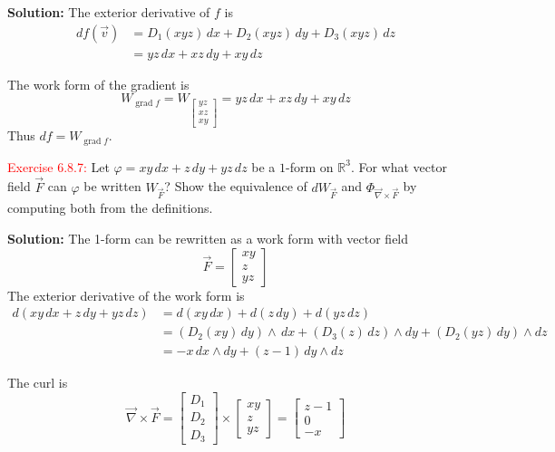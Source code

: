 \documentclass[12pt]{article}
\newcommand{\RR}{\mathbb{R}}
\begin{document}
\textbf{Solution:} 
The exterior derivative of $f$ is 
\begin{align*}
    df(\vec v) 
    &= D_1(xyz) \,dx + D_2(xyz) \,dy + D_3(xyz) \,dz \\
    &= yz \,dx + xz \,dy + xy \,dz
\end{align*}
    
The work form of the gradient is 
\[
    W_{ \operatorname{grad} f}
    = W_{\begin{bmatrix} yz \\ xz \\ xy \end{bmatrix}} 
    = yz \,dx + xz \,dy + xy \,dz
\]
Thus $df = W_{ \operatorname{grad} f}$.

\textcolor{red}{Exercise 6.8.7:}
Let $\varphi = xy \, dx + z\, dy + yz \, dz$
be a $1$-form on $\RR^3$.
For what vector field $\vec F$ can $\varphi$ be written $W_{\vec F}$? Show the equivalence of $dW_{\vec F}$ and $\Phi_{\vec \nabla \times \vec F}$
by computing both from the definitions.
\smallskip

\textbf{Solution: } 
The 1-form can be rewritten as a work form with vector field
\[
    \vec F = \begin{bmatrix} xy \\ z \\ yz \end{bmatrix}
\]
The exterior derivative of the work form is 
\begin{align*}
    d(xy \, dx + z\, dy + yz \, dz)
    &= d(xy \, dx) + d(z\, dy) + d(yz \, dz) \\
    &= (D_2(xy) \,dy) \wedge \,dx + (D_3(z)\,dz)\wedge dy + (D_2(yz)\,dy)\wedge dz \\
    &= -x \,dx \wedge dy + (z-1) \,dy \wedge dz
\end{align*}

The curl is 
\[
    \vec \nabla \times \vec F
    = \begin{bmatrix}
        D_1 \\ D_2 \\ D_3
    \end{bmatrix} \times
    \begin{bmatrix}
        xy \\ z \\ yz
    \end{bmatrix}
    = \begin{bmatrix}
        z-1 \\ 0 \\ -x
    \end{bmatrix}
\]
\end{document}
